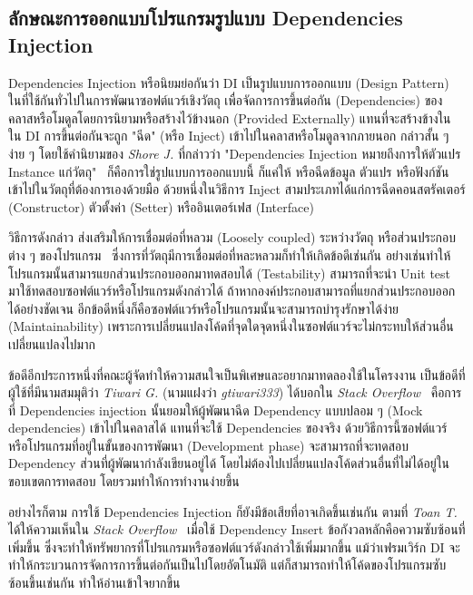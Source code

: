 \documentclass[12pt,one side,openright,a4paper]{cpe-thesis-th}
\newcommand{\thaijustify}[1]{%
  \par\hspace{30pt}\justifying
  #1
}
\begin{document}
    \subsection{ลักษณะการออกแบบโปรแกรมรูปแบบ Dependencies Injection}
        \thaijustify{
            Dependencies Injection หรือนิยมย่อกันว่า DI เป็นรูปแบบการออกแบบ (Design Pattern) ในที่ใช้กันทั่วไปในการพัฒนาซอฟต์แวร์เชิงวัตถุ เพื่อจัดการการขึ้นต่อกัน (Dependencies) ของคลาสหรือโมดูลโดยการนิยามหรือสร้างไว้ข้างนอก (Provided Externally) แทนที่จะสร้างข้างใน ใน DI การขึ้นต่อกันจะถูก "ฉีด" (หรือ Inject) เข้าไปในคลาสหรือโมดูลจากภายนอก กล่าวสั้น ๆ ง่าย ๆ โดยใช้คำนิยามของ \textit{Shore J.} ที่กล่าวว่า "Dependencies Injection หมายถึงการให้ตัวแปร Instance แก่วัตถุ"~\cite{shore06} ก็คือการใช่รูปแบบการออกแบบนี้ ก็แค่ให้ หรือฉีดข้อมูล ตัวแปร หรือฟังก์ชันเข้าไปในวัตถุที่ต้องการเองด้วยมือ ด้วยหนึ่งในวิธีการ Inject สามประเภทได้แก่การฉีดคอนสตรัคเตอร์ (Constructor) ตัวตั้งค่า (Setter) หรืออินเตอร์เฟส (Interface) 
        }
        \thaijustify{
            วิธีการดังกล่าว ส่งเสริมให้การเชื่อมต่อที่หลวม (Loosely coupled) ระหว่างวัตถุ หรือส่วนประกอบต่าง ๆ ของโปรแกรม~\cite{fowlerDI} ซึ่งการที่วัตถุมีการเชื่อมต่อที่หละหลวมก็ทำให้เกิดข้อดีเช่นกัน อย่างเช่นทำให้โปรแกรมนั้นสามารแยกส่วนประกอบออกมาทดสอบได้ (Testability) สามารถที่จะนำ Unit test มาใช้ทดสอบซอฟต์แวร์หรือโปรแกรมดังกล่าวได้ ถ้าหากองค์ประกอบสามารถที่แยกส่วนประกอบออกได้อย่างชัดเจน อีกข้อดีหนึ่งก็คือซอฟต์แวร์หรือโปรแกรมนั้นจะสามารถบำรุงรักษาได้ง่าย (Maintainability) เพราะการเปลี่ยนแปลงโค้ดที่จุดใดจุดหนึ่งในซอฟต์แวร์จะไม่กระทบให้ส่วนอื่นเปลี่ยนแปลงไปมาก~\cite{freeman09}
        }
        \thaijustify{
            ข้อดีอีกประการหนึ่งที่คณะผู้จัดทำให้ความสนใจเป็นพิเศษและอยากมาทดลองใช้ในโครงงาน เป็นข้อดีที่ผู้ใช้ที่มีนามสมมุติว่า \textit{Tiwari G.} (นามแฝงว่า \textit{gtiwari333}) ได้บอกใน \textit{Stack Overflow}~\cite{tiwaristackdi} คือการที่ Dependencies injection นั้นยอมให้ผู้พัฒนาฉีด Dependency แบบปลอม ๆ (Mock dependencies) เข้าไปในคลาสได้ แทนที่จะใช้ Dependencies ของจริง ด้วยวิธีการนี้ซอฟต์แวร์หรือโปรแกรมที่อยู่ในขั้นของการพัฒนา (Development phase) จะสามารถที่จะทดสอบ Dependency ส่วนที่ผู้พัฒนากำลังเขียนอยู่ได้ โดยไม่ต้องไปเปลี่ยนแปลงโค้ดส่วนอื่นที่ไม่ได้อยู่ในขอบเขตการทดสอบ โดยรวมทำให้การทำงานง่ายขึ้น
        }
        \thaijustify{
            อย่างไรก็ตาม การใช้ Dependencies Injection ก็ยังมีข้อเสียที่อาจเกิดขึ้นเช่นกัน ตามที่ \textit{Toan T.} ได้ให้ความเห็นใน \textit{Stack Overflow}~\cite{toanstackdi} เมื่อใช้ Dependency Insert ข้อกังวลหลักคือความซับซ้อนที่เพิ่มขึ้น ซึ่งจะทำให้ทรัพยากรที่โปรแกรมหรือซอฟต์แวร์ดังกล่าวใช้เพิ่มมากขึ้น แม้ว่าเฟรมเวิร์ก DI จะทำให้กระบวนการจัดการการขึ้นต่อกันเป็นไปโดยอัตโนมัติ แต่ก็สามารถทำให้โค้ดของโปรแกรมซับซ้อนขึ้นเช่นกัน ทำให้อ่านเข้าใจยากขึ้น
        }
\end{document}
